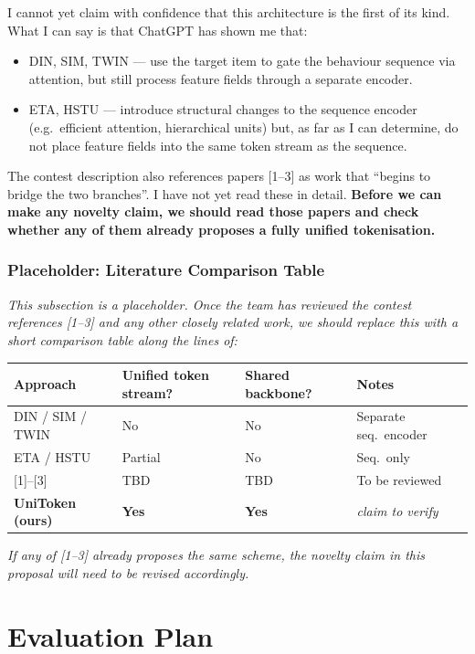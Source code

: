 \documentclass[10pt]{article}
\begin{document}
I cannot yet claim with confidence that this
architecture is the first of its kind. What I can say is that ChatGPT has shown me that: 

\begin{itemize}[noitemsep]
    \item DIN, SIM, TWIN --- use the target item to gate the behaviour
          sequence via attention, but still process feature fields
          through a separate encoder.
    \item ETA, HSTU --- introduce structural changes to the sequence
          encoder (e.g.\ efficient attention, hierarchical units) but,
          as far as I can determine, do not place feature fields into
          the same token stream as the sequence.
\end{itemize}

The contest description also references papers [1--3] as work that
``begins to bridge the two branches''. I have not yet read these in
detail. \textbf{Before we can make any novelty claim, we should read
those papers and check whether any of them already proposes a fully
unified tokenisation.}

\subsubsection*{Placeholder: Literature Comparison Table}

\textit{This subsection is a placeholder. Once the team has reviewed
the contest references [1--3] and any other closely related work, we
should replace this with a short comparison table along the lines of:}

\medskip
\begin{tabular}{@{}llll@{}}
\toprule
Approach & Unified token stream? & Shared backbone? & Notes \\
\midrule
DIN / SIM / TWIN & No & No & Separate seq.\ encoder \\
ETA / HSTU       & Partial & No & Seq.\ only \\
{[}1{]}--{[}3{]} & TBD & TBD & To be reviewed \\
\textbf{UniToken (ours)} & \textbf{Yes} & \textbf{Yes} & \textit{claim to verify} \\
\bottomrule
\end{tabular}
\medskip

\textit{If any of [1--3] already proposes the same scheme, the novelty
claim in this proposal will need to be revised accordingly.}

\section{Evaluation Plan}
\label{sec:eval}
\end{document}
